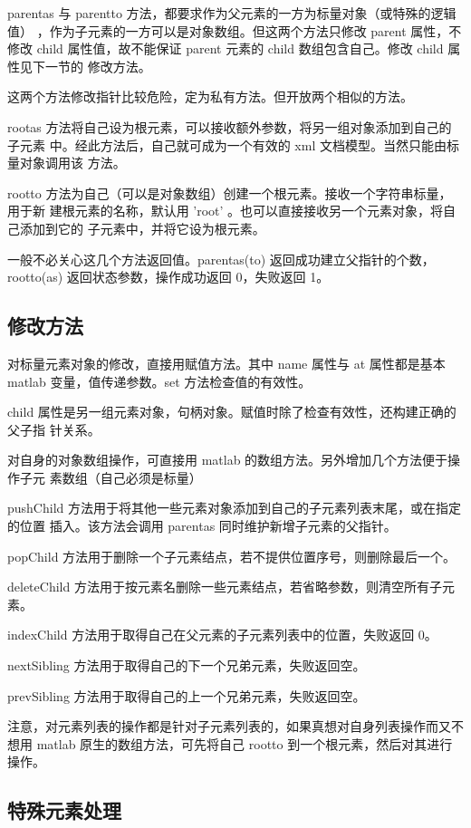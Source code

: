 parentas 与 parentto 方法，都要求作为父元素的一方为标量对象（或特殊的逻辑值）
，作为子元素的一方可以是对象数组。但这两个方法只修改 parent 属性，不修改 child
属性值，故不能保证 parent 元素的 child 数组包含自己。修改 child 属性见下一节的
修改方法。

这两个方法修改指针比较危险，定为私有方法。但开放两个相似的方法。

rootas 方法将自己设为根元素，可以接收额外参数，将另一组对象添加到自己的子元素
中。经此方法后，自己就可成为一个有效的 xml 文档模型。当然只能由标量对象调用该
方法。

rootto 方法为自己（可以是对象数组）创建一个根元素。接收一个字符串标量，用于新
建根元素的名称，默认用 'root' 。也可以直接接收另一个元素对象，将自己添加到它的
子元素中，并将它设为根元素。

一般不必关心这几个方法返回值。parentas(to) 返回成功建立父指针的个数，
rootto(as) 返回状态参数，操作成功返回 0，失败返回 1。

\subsection{修改方法}

对标量元素对象的修改，直接用赋值方法。其中 name 属性与 at 属性都是基本 matlab
变量，值传递参数。set 方法检查值的有效性。

child 属性是另一组元素对象，句柄对象。赋值时除了检查有效性，还构建正确的父子指
针关系。

对自身的对象数组操作，可直接用 matlab 的数组方法。另外增加几个方法便于操作子元
素数组（自己必须是标量）

pushChild 方法用于将其他一些元素对象添加到自己的子元素列表末尾，或在指定的位置
插入。该方法会调用 parentas 同时维护新增子元素的父指针。

popChild 方法用于删除一个子元素结点，若不提供位置序号，则删除最后一个。

deleteChild 方法用于按元素名删除一些元素结点，若省略参数，则清空所有子元素。

indexChild 方法用于取得自己在父元素的子元素列表中的位置，失败返回 0。

nextSibling 方法用于取得自己的下一个兄弟元素，失败返回空。

prevSibling 方法用于取得自己的上一个兄弟元素，失败返回空。

注意，对元素列表的操作都是针对子元素列表的，如果真想对自身列表操作而又不想用
matlab 原生的数组方法，可先将自己 rootto 到一个根元素，然后对其进行操作。

\subsection{特殊元素处理}

